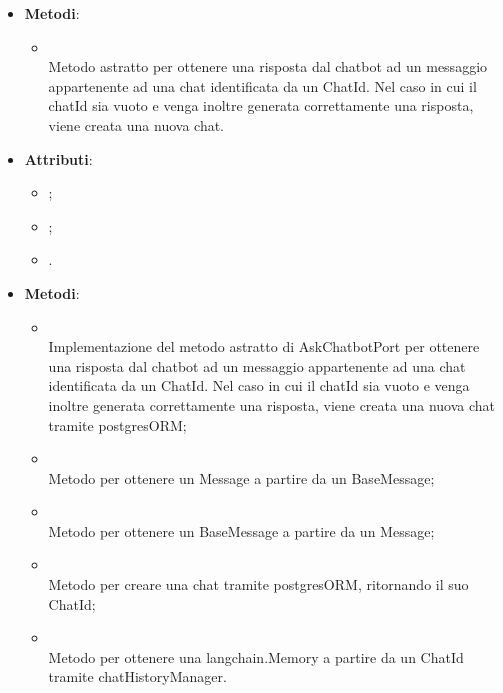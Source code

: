 \documentclass[10pt, a4paper]{article}
\begin{document}
    \label{AskChatbotPortDettaglio}
    \begin{itemize}
        \item \textbf{Metodi}:
        \begin{itemize}
            \item {}\\
            Metodo astratto per ottenere una risposta dal chatbot ad un messaggio appartenente ad una chat identificata da un ChatId. Nel caso in cui il chatId sia vuoto e venga inoltre generata correttamente una risposta, viene creata una nuova chat.
        \end{itemize}
    \end{itemize}
    
    \label{AskChatbotLangchainDettaglio}
    \begin{itemize}
        \item \textbf{Attributi}:
        \begin{itemize}
            \item {};
            \item {};
            \item {}.
        \end{itemize}
        \item \textbf{Metodi}:
        \begin{itemize}
            \item {}\\
            Implementazione del metodo astratto di AskChatbotPort per ottenere una risposta dal chatbot ad un messaggio appartenente ad una chat identificata da un ChatId. Nel caso in cui il chatId sia vuoto e venga inoltre generata correttamente una risposta, viene creata una nuova chat tramite postgresORM;
            \item {}\\
            Metodo per ottenere un Message a partire da un BaseMessage;
            \item {}\\
            Metodo per ottenere un BaseMessage a partire da un Message;
            \item {}\\
            Metodo per creare una chat tramite postgresORM, ritornando il suo ChatId;
            \item {}\\
            Metodo per ottenere una langchain.Memory a partire da un ChatId tramite chatHistoryManager.
        \end{itemize}
    \end{itemize}
    
\end{document}
